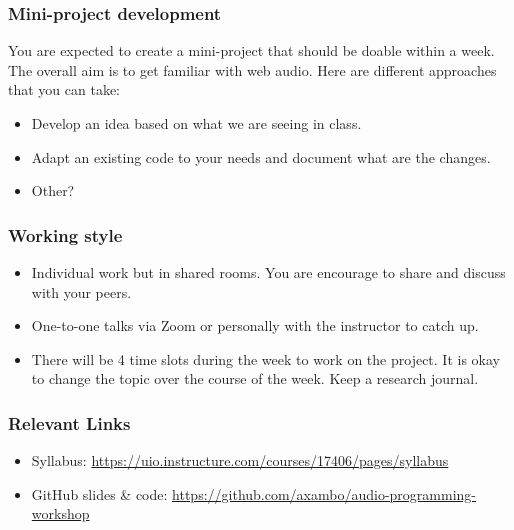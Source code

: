 \documentclass[screen, aspectratio=43]{beamer}
\begin{document}
\begin{frame}
\frametitle{Mini-project development}
You are expected to create a mini-project that should be doable within a week. The overall aim is to get familiar with web audio. Here are different approaches that you can take:
\begin{itemize}
\item Develop an idea based on what we are seeing in class.
\item Adapt an existing code to your needs and document what are the changes.
\item Other?
\end{itemize}
\end{frame}

\begin{frame}
\frametitle{Working style}
\begin{itemize}
\item Individual work but in shared rooms. You are encourage to share and discuss with your peers.
\item One-to-one talks via Zoom or personally with the instructor to catch up.
\item There will be 4 time slots during the week to work on the project. It is okay to change the topic over the course of the week. Keep a research journal.
\end{itemize}
\end{frame}

%
\begin{frame}
\frametitle{Relevant Links}
\begin{itemize}
\item Syllabus: \url{https://uio.instructure.com/courses/17406/pages/syllabus}
\item GitHub slides \& code: \url{https://github.com/axambo/audio-programming-workshop}
\end{itemize}
\end{frame}
%
%
\end{document}
